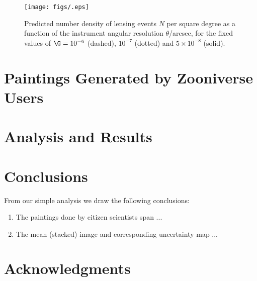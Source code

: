 \documentclass[useAMS,usenatbib]{mn2e}
\begin{document}
\begin{figure*}
\begin{center}
\texttt{[image: figs/.eps]} 
\caption{Predicted number density of lensing events $N$ per square degree as a function of the instrument angular resolution $\theta$/arcsec,
for the fixed values of 
    $\G=10^{-6}$ (dashed), 
       $10^{-7}$ (dotted) and
$5\times10^{-8}$ (solid).}\label{fig:bound}
\end{center}
\end{figure*}



\section{Paintings Generated by Zooniverse Users}
\label{sect:data}




\section{Analysis and Results}
\label{sect:results}




\section{Conclusions}
\label{sect:concl}

From our simple analysis we draw the following conclusions:

\begin{enumerate}

\item The paintings done by citizen scientists span ... 

\item The mean (stacked) image and corresponding uncertainty map ... 

\end{enumerate}


\section*{Acknowledgments} 
\end{document}

